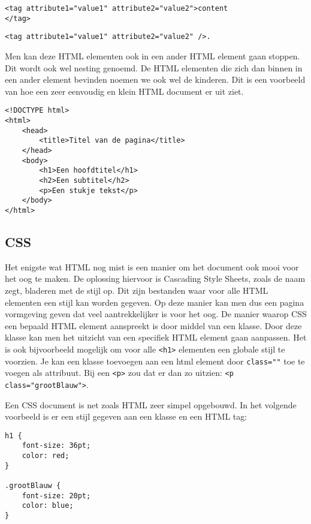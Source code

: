 \begin{lstlisting}[frame=single, caption=HTML Element voorbeeld]
<tag attribute1="value1" attribute2="value2">content
</tag>
\end{lstlisting}
\begin{lstlisting}[frame=single, caption=HTML Element voorbeeld]
<tag attribute1="value1" attribute2="value2" />.
\end{lstlisting}

Men kan deze HTML elementen ook in een ander HTML element gaan stoppen. Dit wordt ook wel nesting genoemd. De HTML elementen die zich dan binnen in een ander element bevinden noemen we ook wel de kinderen. Dit is een voorbeeld van hoe een zeer eenvoudig en klein HTML document er uit ziet.

\begin{lstlisting}[frame=single, caption=Voorbeeld van een HTML bestand]
<!DOCTYPE html>
<html>
	<head>
		<title>Titel van de pagina</title>
	</head>
	<body>
		<h1>Een hoofdtitel</h1>
		<h2>Een subtitel</h2>
		<p>Een stukje tekst</p>
	</body>
</html>
\end{lstlisting}

\subsection{CSS}
Het enigste wat HTML nog mist is een manier om het document ook mooi voor het oog te maken. De oplossing hiervoor is Cascading Style Sheets, zoals de naam zegt, bladeren met de stijl op. Dit zijn bestanden waar voor alle HTML elementen een stijl kan worden gegeven. Op deze manier kan men dus een pagina vormgeving geven dat veel aantrekkelijker is voor het oog. De manier waarop CSS een bepaald HTML element aanspreekt is door middel van een klasse. Door deze klasse kan men het uitzicht van een specifiek HTML element gaan aanpassen. Het is ook bijvoorbeeld mogelijk om voor alle \lstinline[basicstyle=\ttfamily\color{red}]|<h1>| elementen een globale stijl te voorzien. Je kan een klasse toevoegen aan een html element door \lstinline[basicstyle=\ttfamily\color{red}]|class=""| toe te voegen als attribuut. Bij een \lstinline[basicstyle=\ttfamily\color{red}]|<p>| zou dat er dan zo uitzien: \lstinline[basicstyle=\ttfamily\color{red}]|<p class="grootBlauw">|.

Een CSS document is net zoals HTML zeer simpel opgebouwd. In het volgende voorbeeld is er een stijl gegeven aan een klasse en een HTML tag:

\begin{lstlisting}[frame=single, caption=Voorbeeld van een CSS bestand]
h1 {
	font-size: 36pt;
	color: red;
}

.grootBlauw {
	font-size: 20pt;
	color: blue;
}
\end{lstlisting}

